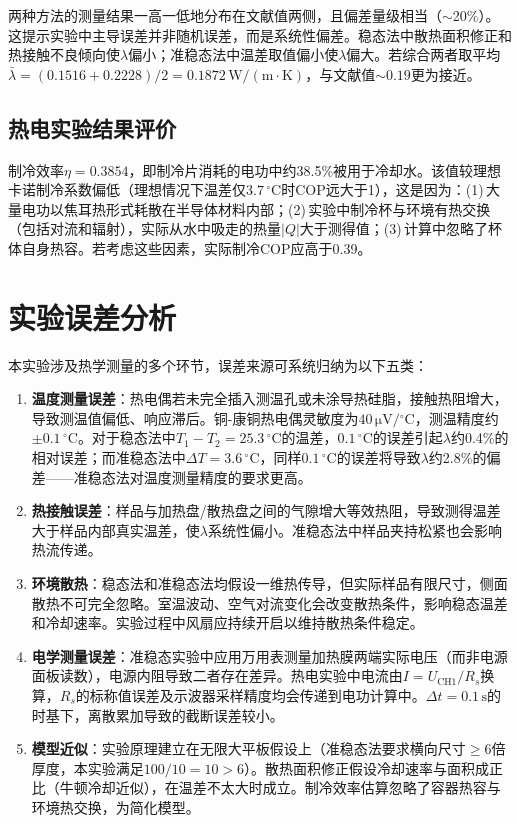 \documentclass[UTF8]{article}
\begin{document}
两种方法的测量结果一高一低地分布在文献值两侧，且偏差量级相当（$\sim$20\%）。这提示实验中主导误差并非随机误差，而是系统性偏差。稳态法中散热面积修正和热接触不良倾向使$\lambda$偏小；准稳态法中温差取值偏小使$\lambda$偏大。若综合两者取平均$\bar{\lambda}=(0.1516+0.2228)/2 = 0.1872\,\mathrm{W/(m\cdot K)}$，与文献值$\sim 0.19$更为接近。

\subsection{热电实验结果评价}

制冷效率$\eta = 0.3854$，即制冷片消耗的电功中约38.5\%被用于冷却水。该值较理想卡诺制冷系数偏低（理想情况下温差仅$3.7\,^{\circ}\mathrm{C}$时COP远大于1），这是因为：(1)\,大量电功以焦耳热形式耗散在半导体材料内部；(2)\,实验中制冷杯与环境有热交换（包括对流和辐射），实际从水中吸走的热量$|Q|$大于测得值；(3)\,计算中忽略了杯体自身热容。若考虑这些因素，实际制冷COP应高于0.39。

\section{实验误差分析}

本实验涉及热学测量的多个环节，误差来源可系统归纳为以下五类：

\begin{enumerate}
    \item \textbf{温度测量误差}：热电偶若未完全插入测温孔或未涂导热硅脂，接触热阻增大，导致测温值偏低、响应滞后。铜-康铜热电偶灵敏度为$40\,\mathrm{\mu V/{^{\circ}C}}$，测温精度约$\pm 0.1\,^{\circ}\mathrm{C}$。对于稳态法中$T_1-T_2=25.3\,^{\circ}\mathrm{C}$的温差，$0.1\,^{\circ}\mathrm{C}$的误差引起$\lambda$约0.4\%的相对误差；而准稳态法中$\Delta T=3.6\,^{\circ}\mathrm{C}$，同样$0.1\,^{\circ}\mathrm{C}$的误差将导致$\lambda$约2.8\%的偏差——准稳态法对温度测量精度的要求更高。

    \item \textbf{热接触误差}：样品与加热盘/散热盘之间的气隙增大等效热阻，导致测得温差大于样品内部真实温差，使$\lambda$系统性偏小。准稳态法中样品夹持松紧也会影响热流传递。

    \item \textbf{环境散热}：稳态法和准稳态法均假设一维热传导，但实际样品有限尺寸，侧面散热不可完全忽略。室温波动、空气对流变化会改变散热条件，影响稳态温差和冷却速率。实验过程中风扇应持续开启以维持散热条件稳定。

    \item \textbf{电学测量误差}：准稳态实验中应用万用表测量加热膜两端实际电压（而非电源面板读数），电源内阻导致二者存在差异。热电实验中电流由$I = U_{\text{CH1}}/R_s$换算，$R_s$的标称值误差及示波器采样精度均会传递到电功计算中。$\Delta t = 0.1\,\mathrm{s}$的时基下，离散累加导致的截断误差较小。

    \item \textbf{模型近似}：实验原理建立在无限大平板假设上（准稳态法要求横向尺寸$\geq 6$倍厚度，本实验满足$100/10=10>6$）。散热面积修正假设冷却速率与面积成正比（牛顿冷却近似），在温差不太大时成立。制冷效率估算忽略了容器热容与环境热交换，为简化模型。
\end{enumerate}
\end{document}
